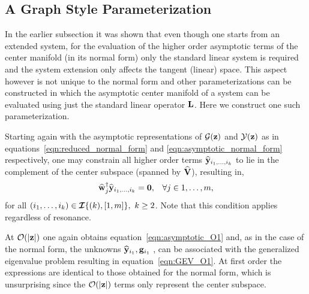 \subsection{A Graph Style Parameterization}
\label{sec:graph_method}

In the earlier subsection it was shown that even though one starts from an extended system, for the evaluation of the higher order asymptotic terms of the center manifold (in its normal form) only  the standard linear system is required and the system extension only affects the tangent (linear) space. This aspect however is not unique to the normal form and other parameterizations can be constructed in which the asymptotic center manifold of a system can be evaluated using just the standard linear operator $\mathbf{L}$. Here we construct one such parameterization.

Starting again with the asymptotic representations of $\mathcal{G}(\mathbf{z})$ and $\mathcal{Y}(\mathbf{z})$ as in equations~\eqref{eqn:reduced_normal_form} and \eqref{eqn:asymptotic_normal_form} respectively, one may constrain all higher order terms $\widehat{\mathbf{y}}_{i_{1},\ldots,i_{k}}$ to lie in the complement of the center subspace (spanned by $\widehat{\mathbf{V}}$), resulting in,
\begin{align}
	\label{eqn:graph_condition}
	\widehat{\mathbf{w}}^{\dagger}_{j}\widehat{\mathbf{y}}_{i_{1},\ldots,i_{k}} = \mathbf{0}, && \forall j\in1,\ldots,m,
\end{align}
for all $(i_{1},\ldots,i_{k})\in\IndexSet{k}{1,m},\ k\ge2$. Note that this condition applies regardless of resonance. 

At $\mathcal{O}(|\mathbf{z}|)$ one again obtains equation~\eqref{eqn:asymptotic_O1} and, as in the case of the normal form, the unknowns $\widehat{\mathbf{y}}_{i_{1}},\mathbf{g}_{i_{1}}$ \etc, can be associated with the generalized eigenvalue problem resulting in equation~\eqref{eqn:GEV_O1}. At first order the expressions are identical to those obtained for the normal form, which is unsurprising since the $\mathcal{O}(|\mathbf{z}|)$ terms only represent the center subspace.

